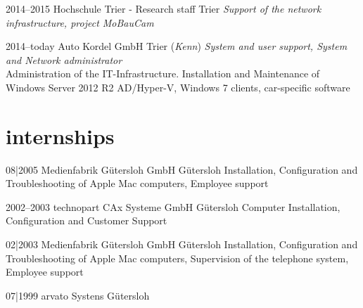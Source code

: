 \documentclass[]{friggeri-cv} %
\begin{document}
\begin{entrylist}
\entry
{2014--2015}
{Hochschule Trier - Research staff}
{Trier}
{\emph{Support of the network infrastructure, project MoBauCam} \\
}


\entry
{2014--today}
{Auto Kordel GmbH}
{Trier (\textit{Kenn})}
{\emph{System and user support, System and Network administrator} \\
Administration of the IT-Infrastructure. Installation and Maintenance of Windows Server 2012 R2 AD/Hyper-V, Windows 7 clients, car-specific software}


\end{entrylist}


\section{internships}

\begin{entrylist}

\entry
{08|2005}
{Medienfabrik Gütersloh GmbH}
{Gütersloh}
{Installation, Configuration and Troubleshooting of Apple Mac computers, Employee support}


\entry
{2002--2003}
{technopart CAx Systeme GmbH}
{Gütersloh}
{Computer Installation, Configuration and Customer Support}


\entry
{02|2003}
{Medienfabrik Gütersloh GmbH}
{Gütersloh}
{Installation, Configuration and Troubleshooting of Apple Mac computers, 
Supervision of the telephone system, Employee support}

 
\entry
{07|1999}
{arvato Systens}
{Gütersloh}
{}


\end{entrylist}
\end{document}
